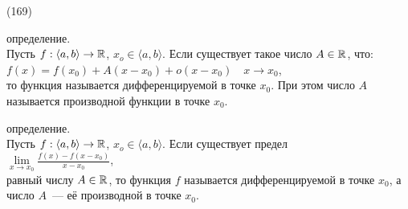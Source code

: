 (169)

 определение.\\
Пусть $f: \langle a, b\rangle \to \mathbb{R}$, $x_o \in \langle a, b\rangle$. Если существует такое число $A \in \mathbb{R}$, что:\\
$f(x) = f(x_0) + A(x - x_0) + o(x - x_0) \quad x \to x_0$,\\
то функция называется дифференцируемой в точке $x_0$. При этом число $A$ называется производной функции в точке $x_0$.

 определение.\\
Пусть $f: \langle a, b\rangle \to \mathbb{R}$, $x_o \in \langle a, b\rangle$.
Если существует предел\\
$\lim\limits_{x\to x_0} \frac{f(x) - f(x - x_0)}{x - x_0}$,\\
равный числу $A \in \mathbb{R}$, то функция $f$ называется дифференцируемой в точке $x_0$, а число $A$~--- её производной в точке $x_0$.
